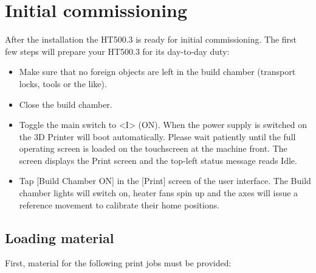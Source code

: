 \section{Initial commissioning}

After the installation the HT500.3 is ready for initial commissioning. The first few steps will prepare your HT500.3 for its day-to-day duty:

\begin{itemize}
  \item Make sure that no foreign objects are left in the build chamber 
        (transport locks, tools or the like).
  \item Close the build chamber.
  \item Toggle the main switch to <I> (ON).
        When the power supply is switched on the 3D Printer will boot automatically. Please wait patiently until the full operating screen is loaded on the touchscreen at the machine front. The screen displays the Print screen and the top-left status message reads Idle.
  \item Tap [Build Chamber ON] in the [Print] screen of the user interface. The Build chamber lights will switch on, heater fans
        spin up and the axes will issue a reference movement to calibrate their home positions.
\end{itemize}


\subsection{Loading material}

First, material for the following print jobs must be provided:

